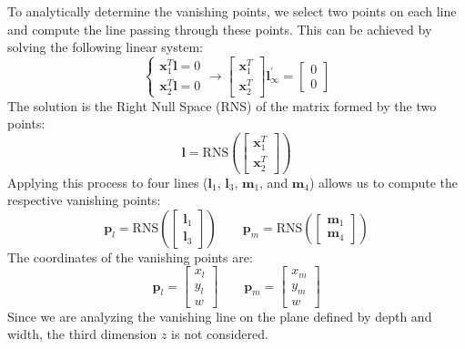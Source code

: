 To analytically determine the vanishing points, we select two points on each line and compute the line passing through these points. 
This can be achieved by solving the following linear system:
\[\begin{cases} \mathbf{x}_1^T\mathbf{l}=0 \\ \mathbf{x}_2^T\mathbf{l}=0 \end{cases} \rightarrow \begin{bmatrix} \mathbf{x}_1^T\\ \mathbf{x}_2^T \end{bmatrix}\mathbf{l}^\prime_{\infty}=\begin{bmatrix} 0 \\ 0 \end{bmatrix}\]
The solution is the Right Null Space (RNS) of the matrix formed by the two points:
\[\mathbf{l}=\text{RNS}\left(\begin{bmatrix} \mathbf{x}_1^T \\ \mathbf{x}_2^T \end{bmatrix}\right)\]
Applying this process to four lines ($\mathbf{l}_1$, $\mathbf{l}_3$, $\mathbf{m}_1$, and $\mathbf{m}_4$) allows us to compute the respective vanishing points:
\[\mathbf{p}_l=\text{RNS}\left(\begin{bmatrix} \mathbf{l}_1 \\ \mathbf{l}_3 \end{bmatrix}\right) \qquad \mathbf{p}_m=\text{RNS}\left(\begin{bmatrix} \mathbf{m}_1 \\ \mathbf{m}_4 \end{bmatrix}\right)\]
The coordinates of the vanishing points are:
\[\mathbf{p}_l=\begin{bmatrix} x_l \\ y_l \\ w \end{bmatrix} \qquad \mathbf{p}_m=\begin{bmatrix} x_m \\ y_m \\ w \end{bmatrix}\]
Since we are analyzing the vanishing line on the plane defined by depth and width, the third dimension $z$ is not considered.

